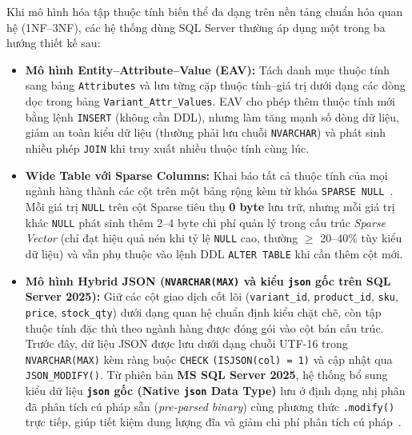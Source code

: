 Khi mô hình hóa tập thuộc tính biến thể đa dạng trên nền tảng chuẩn hóa quan hệ (1NF--3NF), các hệ thống dùng SQL Server thường áp dụng một trong ba hướng thiết kế sau:
\begin{itemize}
  \item \textbf{Mô hình Entity--Attribute--Value (EAV):} Tách danh mục thuộc tính sang bảng \texttt{Attributes} và lưu từng cặp thuộc tính--giá trị dưới dạng các dòng dọc trong bảng \texttt{Variant\_Attr\_Values}. EAV cho phép thêm thuộc tính mới bằng lệnh \texttt{INSERT} (không cần DDL), nhưng làm tăng mạnh số dòng dữ liệu, giảm an toàn kiểu dữ liệu (thường phải lưu chuỗi \texttt{NVARCHAR}) và phát sinh nhiều phép \texttt{JOIN} khi truy xuất nhiều thuộc tính cùng lúc.
  \item \textbf{Wide Table với Sparse Columns:} Khai báo tất cả thuộc tính của mọi ngành hàng thành các cột trên một bảng rộng kèm từ khóa \texttt{SPARSE NULL}~\cite{t1_mssparse}. Mỗi giá trị \texttt{NULL} trên cột Sparse tiêu thụ \textbf{0 byte} lưu trữ, nhưng mỗi giá trị khác \texttt{NULL} phát sinh thêm 2--4 byte chi phí quản lý trong cấu trúc \textit{Sparse Vector} (chỉ đạt hiệu quả nén khi tỷ lệ \texttt{NULL} cao, thường $\ge$ 20--40\% tùy kiểu dữ liệu) và vẫn phụ thuộc vào lệnh DDL \texttt{ALTER TABLE} khi cần thêm cột mới.
  \item \textbf{Mô hình Hybrid JSON (\texttt{NVARCHAR(MAX)} và kiểu \texttt{json} gốc trên SQL Server 2025):} Giữ các cột giao dịch cốt lõi (\texttt{variant\_id}, \texttt{product\_id}, \texttt{sku}, \texttt{price}, \texttt{stock\_qty}) dưới dạng quan hệ chuẩn định kiểu chặt chẽ, còn tập thuộc tính đặc thù theo ngành hàng được đóng gói vào cột bán cấu trúc. Trước đây, dữ liệu JSON được lưu dưới dạng chuỗi UTF-16 trong \texttt{NVARCHAR(MAX)} kèm ràng buộc \texttt{CHECK} \texttt{(ISJSON(col) = 1)} và cập nhật qua \texttt{JSON\_MODIFY()}. Từ phiên bản \textbf{MS SQL Server 2025}, hệ thống bổ sung kiểu dữ liệu \textbf{\texttt{json} gốc (Native \texttt{json} Data Type)} lưu ở định dạng nhị phân đã phân tích cú pháp sẵn (\textit{pre-parsed binary}) cùng phương thức \texttt{.modify()} trực tiếp, giúp tiết kiệm dung lượng đĩa và giảm chi phí phân tích cú pháp~\cite{t1_msnativejson}.
\end{itemize}

